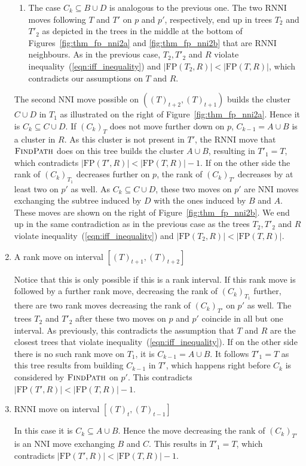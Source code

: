 \documentclass{amsart}
\newcommand{\rnni}{\mathrm{RNNI}}
\newcommand{\findpath}{\textsc{FindPath}}
\newcommand{\nni}{\mathrm{NNI}}
\newcommand{\fp}{\mathrm{FP}}
\begin{document}
\begin{enumerate}[label = 1.{\arabic*}]
\begin{enumerate}[label = \theenumi.\arabic*]
	\item
	The case $C_k \subseteq B \cup D$ is analogous to the previous one.
    The two $\rnni$ moves following $T$ and $T'$ on $p$ and $p'$, respectively, end up in trees $T_2$ and $T'_2$ as depicted in the trees in the middle at the bottom of Figures~\ref{fig:thm_fp_nni2a} and \ref{fig:thm_fp_nni2b} that are $\rnni$ neighbours.
    As in the previous case, $T_2, T'_2$ and $R$ violate inequality~(\ref{eqn:iff_inequality}) and $|\fp(T_2,R)| < |\fp(T,R)|$, which contradicts our assumptions on $T$ and $R$.
\end{enumerate}

The second $\nni$ move possible on $((T)_{t+2},(T)_{t+1})$ builds the cluster $C \cup D$ in $T_1$ as illustrated on the right of Figure~\ref{fig:thm_fp_nni2a}.
Hence it is $C_k \subseteq C \cup D$.
If $(C_k)_T$ does not move further down on $p$, $C_{k-1} = A \cup B$ is a cluster in $R$.
As this cluster is not present in $T'$, the $\rnni$ move that $\findpath$ does on this tree builds the cluster $A \cup B$, resulting in $T'_1 = T$, which contradicts $|\fp(T',R)| < |\fp(T,R)| - 1$.
If on the other side the rank of $(C_k)_{T_1}$ decreases further on $p$, the rank of $(C_k)_{T'}$ decreases by at least two on $p'$ as well.
As $C_k \subseteq C \cup D$, these two moves on $p'$ are $\nni$ moves exchanging the subtree induced by $D$ with the ones induced by $B$ and $A$.
These moves are shown on the right of Figure~\ref{fig:thm_fp_nni2b}.
We end up in the same contradiction as in the previous case as the trees $T_2, T'_2$ and $R$ violate inequality~(\ref{eqn:iff_inequality}) and $|\fp(T_2,R)| < |\fp(T,R)|$.

\item A rank move on interval $[(T)_{t+1},(T)_{t+2}]$

Notice that this is only possible if this is a rank interval.
If this rank move is followed by a further rank move, decreasing the rank of $(C_k)_{T_1}$ further, there are two rank moves decreasing the rank of $(C_k)_{T'}$ on $p'$ as well.
The trees $T_2$ and $T'_2$ after these two moves on $p$ and $p'$ coincide in all but one interval.
As previously, this contradicts the assumption that $T$ and $R$ are the closest trees that violate inequality~(\ref{eqn:iff_inequality}).
If on the other side there is no such rank move on $T_1$, it is $C_{k-1} = A \cup B$.
It follows $T'_1 = T$ as this tree results from building $C_{k-1}$ in $T'$, which happens right before $C_k$ is considered by $\findpath$ on $p'$.
This contradicts $|\fp(T',R)| < |\fp(T,R)| - 1$.

\item $\rnni$ move on interval $[(T)_{t},(T)_{t-1}]$

In this case it is $C_k \subseteq A \cup B$.
Hence the move decreasing the rank of $(C_k)_{T'}$ is an $\nni$ move exchanging $B$ and $C$.
This results in $T'_1 = T$, which contradicts $|\fp(T',R)| < |\fp(T,R)| - 1$.
\end{enumerate}
\end{document}
